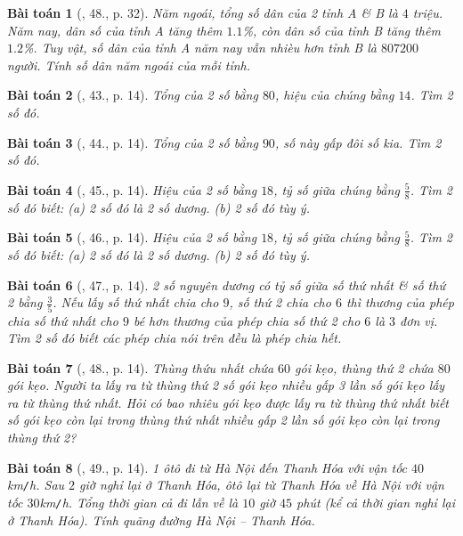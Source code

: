 \documentclass{article}
\newtheorem{baitoan}{Bài toán}
\begin{document}
\begin{baitoan}[\cite{SGK_Toan_8_tap_2}, 48., p. 32]
	Năm ngoái, tổng số dân của 2 tỉnh A \& B là $4$ triệu. Năm nay, dân số của tỉnh A tăng thêm $1.1$\%, còn dân số của tỉnh B tăng thêm $1.2$\%. Tuy vật, số dân của tỉnh A năm nay vẫn nhièu hơn tỉnh B là $807200$ người. Tính số dân năm ngoái của mỗi tỉnh.
\end{baitoan}

\begin{baitoan}[\cite{SBT_Toan_8_tap_2}, 43., p. 14]
	Tổng của 2 số bằng $80$, hiệu của chúng bằng $14$. Tìm 2 số đó.	
\end{baitoan}

\begin{baitoan}[\cite{SBT_Toan_8_tap_2}, 44., p. 14]
	Tổng của 2 số bằng $90$, số này gấp đôi số kia. Tìm 2 số đó.
\end{baitoan}

\begin{baitoan}[\cite{SBT_Toan_8_tap_2}, 45., p. 14]
	Hiệu của 2 số bằng $18$, tỷ số giữa chúng bằng $\frac{5}{8}$. Tìm 2 số đó biết: (a) 2 số đó là 2 số dương. (b) 2 số đó tùy ý.
\end{baitoan}

\begin{baitoan}[\cite{SBT_Toan_8_tap_2}, 46., p. 14]
	Hiệu của 2 số bằng $18$, tỷ số giữa chúng bằng $\frac{5}{8}$. Tìm 2 số đó biết: (a) 2 số đó là 2 số dương. (b) 2 số đó tùy ý.
\end{baitoan}

\begin{baitoan}[\cite{SBT_Toan_8_tap_2}, 47., p. 14]
	2 số nguyên dương có tỷ số giữa số thứ nhất \& số thứ 2 bằng $\frac{3}{5}$. Nếu lấy số thứ nhất chia cho $9$, số thứ 2 chia cho $6$ thì thương của phép chia số thứ nhất cho $9$ bé hơn thương của phép chia số thứ 2 cho $6$ là $3$ đơn vị. Tìm 2 số đó biết các phép chia nói trên đều là phép chia hết.
\end{baitoan}

\begin{baitoan}[\cite{SBT_Toan_8_tap_2}, 48., p. 14]
	Thùng thứu nhất chứa $60$ gói kẹo, thùng thứ 2 chứa $80$ gói kẹo. Người ta lấy ra từ thùng thứ 2 số gói kẹo nhiều gấp 3 lần số gói kẹo lấy ra từ thùng thứ nhất. Hỏi có bao nhiêu gói kẹo được lấy ra từ thùng thứ nhất biết số gói kẹo còn lại trong thùng thứ nhất nhiều gấp 2 lần số gói kẹo còn lại trong thùng thứ 2?
\end{baitoan}

\begin{baitoan}[\cite{SBT_Toan_8_tap_2}, 49., p. 14]
	1 ôtô đi từ Hà Nội đến Thanh Hóa với vận tốc $40$\emph{km\texttt{/}h}. Sau $2$ giờ nghỉ lại ở Thanh Hóa, ôtô lại từ Thanh Hóa về Hà Nội với vận tốc $30$\emph{km\texttt{/}h}. Tổng thời gian cả đi lẫn về là $10$ giờ $45$ phút (kể cả thời gian nghỉ lại ở Thanh Hóa). Tính quãng đường Hà Nội -- Thanh Hóa.
\end{baitoan}
\end{document}
